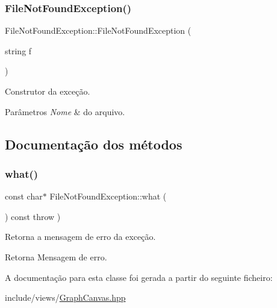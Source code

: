 \subsubsection{\texorpdfstring{File\+Not\+Found\+Exception()}{FileNotFoundException()}}
{\footnotesize\ttfamily File\+Not\+Found\+Exception\+::\+File\+Not\+Found\+Exception (\begin{DoxyParamCaption}\item[{string}]{f }\end{DoxyParamCaption})\hspace{0.3cm}{\ttfamily [inline]}}

Construtor da exceção. 
\begin{DoxyParams}{Parâmetros}
{\em Nome} & do arquivo. \\
\hline
\end{DoxyParams}


\subsection{Documentação dos métodos}
\mbox{\label{classFileNotFoundException_a7b845599455543d92dffe50950f5fa8d}} 
\subsubsection{\texorpdfstring{what()}{what()}}
{\footnotesize\ttfamily const char$\ast$ File\+Not\+Found\+Exception\+::what (\begin{DoxyParamCaption}{ }\end{DoxyParamCaption}) const throw  ) \hspace{0.3cm}{\ttfamily [inline]}}

Retorna a mensagem de erro da exceção. \begin{DoxyReturn}{Retorna}
Mensagem de erro. 
\end{DoxyReturn}


A documentação para esta classe foi gerada a partir do seguinte ficheiro\+:\begin{DoxyCompactItemize}
\item 
include/views/\hyperlink{GraphCanvas_8hpp}{Graph\+Canvas.\+hpp}\end{DoxyCompactItemize}
